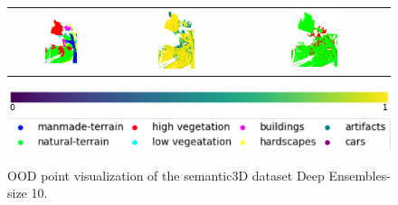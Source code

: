 \begin{figure}[h!]
\begin{tabular}{ccc}
                \includegraphics[width=0.33\textwidth, height=0.18\textheight]{images/ood_imgs/de_sem3d/de_class_prob_3.png} &
                \includegraphics[width=0.33\textwidth, height=0.18\textheight]{images/ood_imgs/de_sem3d/de_prob_10_3.png}& 
                \includegraphics[width=0.33\textwidth, height=0.18\textheight]{images/ood_imgs/de_sem3d/de_ood_auroc_3.png}\\
            \end{tabular}
            \includegraphics[scale=0.45]{images/prob_legend.pdf}
            \includegraphics[scale=0.65]{images/legend.png}
            \caption{OOD point visualization of the semantic3D dataset Deep Ensembles-size 10.}
            \label{fig:de_ood_auroc_sem3d_prob}
        \end{figure}
